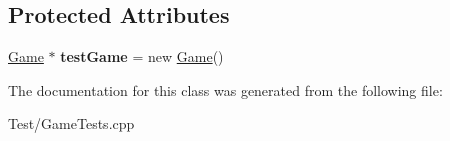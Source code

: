 \subsection*{Protected Attributes}
\begin{DoxyCompactItemize}
\item 
\mbox{\label{classGameTests_a63436947b204dc10220003394490be41}} 
\hyperlink{classGame}{Game} $\ast$ {\bfseries test\+Game} = new \hyperlink{classGame}{Game}()
\end{DoxyCompactItemize}


The documentation for this class was generated from the following file\+:\begin{DoxyCompactItemize}
\item 
Test/Game\+Tests.\+cpp\end{DoxyCompactItemize}
